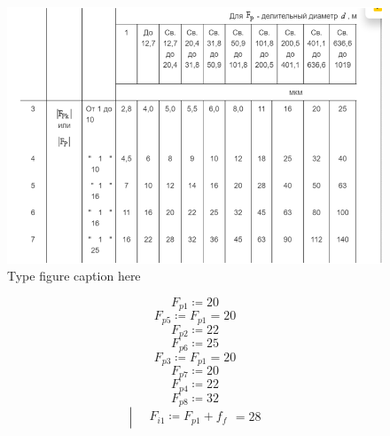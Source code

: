 \documentclass{article}
\newcommand{\defeq}{\coloneq} %
\begin{document}
\begin{figure}[h!]
 \begin{center}
  \includegraphics[max width=\textwidth]{calculations/785.png}
  \caption{Type figure caption here}
  \label{fig:785}
 \end{center}
\end{figure}
\begin{equation*}
\textit{F}_{\textit{p1}} \defeq 20
\end{equation*}
\begin{equation*}
\textit{F}_{\textit{p5}} \defeq \textit{F}_{\textit{p1}} = {20}
\end{equation*}
\begin{equation*}
\textit{F}_{\textit{p2}} \defeq 22
\end{equation*}
\begin{equation*}
\textit{F}_{\textit{p6}} \defeq 25
\end{equation*}
\begin{equation*}
\textit{F}_{\textit{p3}} \defeq \textit{F}_{\textit{p1}} = {20}
\end{equation*}
\begin{equation*}
\textit{F}_{\textit{p7}} \defeq 20
\end{equation*}
\begin{equation*}
\textit{F}_{\textit{p4}} \defeq 22
\end{equation*}
\begin{equation*}
\textit{F}_{\textit{p8}} \defeq 32
\end{equation*}
\begin{equation*}

\left| \begin{aligned}
\,&\textit{F}_{\textit{i1}} \defeq \textit{F}_{\textit{p1}}+f_{f}\end{aligned} \right. = {28}
\end{equation*}
\end{document}
